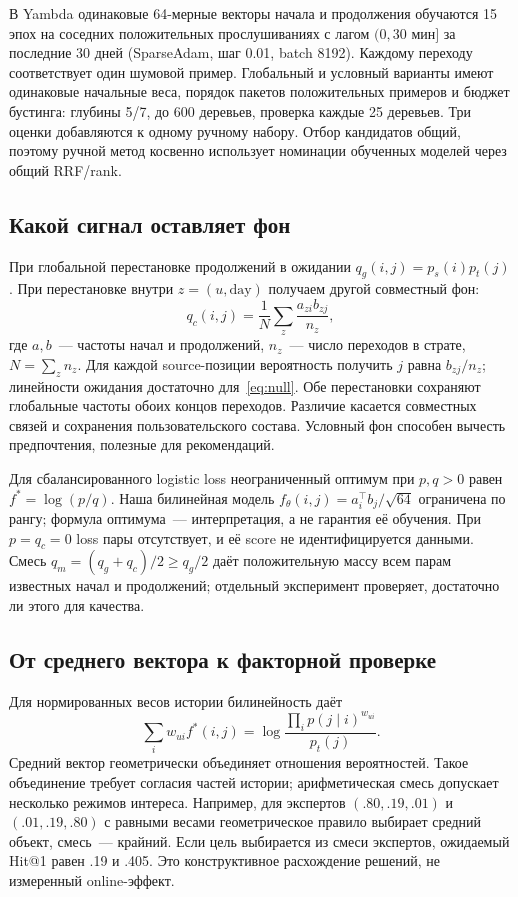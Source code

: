 \documentclass[10pt,a4paper,twocolumn]{article}
\begin{document}
В Yambda одинаковые 64-мерные векторы начала и продолжения обучаются
15 эпох на соседних положительных прослушиваниях с лагом $(0,30\text{ мин}]$
за последние 30 дней (SparseAdam, шаг 0.01, batch 8192).
Каждому переходу соответствует один шумовой пример.
Глобальный и условный варианты имеют одинаковые начальные веса,
порядок пакетов положительных примеров и бюджет бустинга:
глубины 5/7, до 600 деревьев, проверка каждые 25 деревьев. Три оценки добавляются
к одному ручному набору. Отбор кандидатов общий, поэтому ручной метод косвенно
использует номинации обученных моделей через общий RRF/rank.

\subsection{Какой сигнал оставляет фон}
При глобальной перестановке продолжений в ожидании
$q_g(i,j)=p_s(i)p_t(j)$. При перестановке внутри $z=(u,\mathrm{day})$
получаем другой совместный фон:
\begin{equation}
 q_c(i,j)=\frac1N\sum_z\frac{a_{zi}b_{zj}}{n_z},
 \label{eq:null}
\end{equation}
где $a,b$~--- частоты начал и продолжений, $n_z$~--- число переходов
в страте, $N=\sum_z n_z$. Для каждой source-позиции вероятность получить $j$
равна $b_{zj}/n_z$; линейности ожидания достаточно для~\eqref{eq:null}.
Обе перестановки сохраняют глобальные частоты обоих концов переходов.
Различие касается совместных связей и сохранения пользовательского состава.
Условный фон способен вычесть предпочтения, полезные для рекомендаций.

Для сбалансированного logistic loss неограниченный оптимум при $p,q>0$
равен $f^*=\log(p/q)$. Наша билинейная модель
$f_\theta(i,j)=a_i^\top b_j/\sqrt{64}$ ограничена по рангу;
формула оптимума~--- интерпретация, а не гарантия её обучения.
При $p=q_c=0$ loss пары отсутствует, и её score не идентифицируется данными.
Смесь $q_m=(q_g+q_c)/2\ge q_g/2$ даёт положительную массу
всем парам известных начал и продолжений; отдельный эксперимент проверяет,
достаточно ли этого для качества.

\subsection{От среднего вектора к факторной проверке}
Для нормированных весов истории билинейность даёт
\begin{equation}
 \sum_i w_{ui}f^*(i,j)
 =\log\frac{\prod_i p(j\mid i)^{w_{ui}}}{p_t(j)}.
 \label{eq:pool}
\end{equation}
Средний вектор геометрически объединяет отношения вероятностей.
Такое объединение требует согласия частей истории;
арифметическая смесь допускает несколько режимов интереса.
Например, для экспертов $(.80,.19,.01)$ и $(.01,.19,.80)$ с равными
весами геометрическое правило выбирает средний объект, смесь~--- крайний.
Если цель выбирается из смеси экспертов, ожидаемый Hit@1 равен .19 и .405.
Это конструктивное расхождение решений, не измеренный online-эффект.
\end{document}
